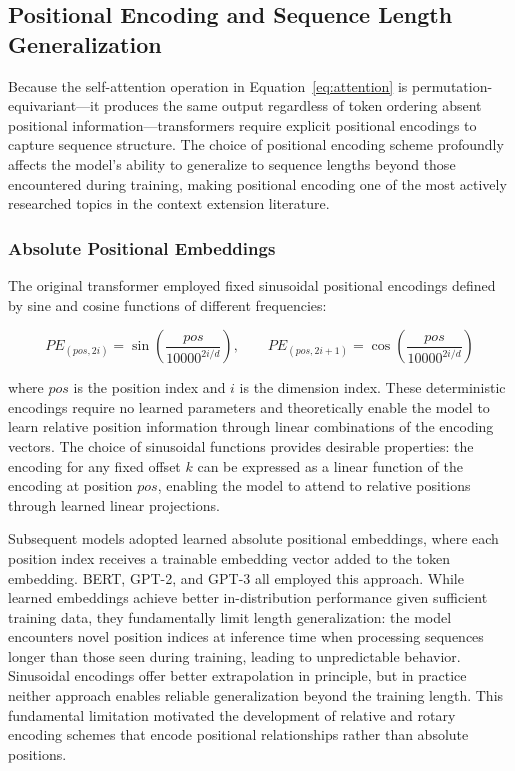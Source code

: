 \documentclass[11pt,letterpaper]{article}
\begin{document}
\subsection{Positional Encoding and Sequence Length Generalization}

Because the self-attention operation in Equation~\ref{eq:attention} is permutation-equivariant---it produces the same output regardless of token ordering absent positional information---transformers require explicit positional encodings to capture sequence structure. The choice of positional encoding scheme profoundly affects the model's ability to generalize to sequence lengths beyond those encountered during training, making positional encoding one of the most actively researched topics in the context extension literature.

\subsubsection{Absolute Positional Embeddings}

The original transformer employed fixed sinusoidal positional encodings defined by sine and cosine functions of different frequencies:

\begin{equation}
PE_{(pos, 2i)} = \sin\!\left(\frac{pos}{10000^{2i/d}}\right), \qquad PE_{(pos, 2i+1)} = \cos\!\left(\frac{pos}{10000^{2i/d}}\right)
\end{equation}

where $pos$ is the position index and $i$ is the dimension index. These deterministic encodings require no learned parameters and theoretically enable the model to learn relative position information through linear combinations of the encoding vectors. The choice of sinusoidal functions provides desirable properties: the encoding for any fixed offset $k$ can be expressed as a linear function of the encoding at position $pos$, enabling the model to attend to relative positions through learned linear projections.

Subsequent models adopted learned absolute positional embeddings, where each position index receives a trainable embedding vector added to the token embedding. BERT, GPT-2, and GPT-3 all employed this approach. While learned embeddings achieve better in-distribution performance given sufficient training data, they fundamentally limit length generalization: the model encounters novel position indices at inference time when processing sequences longer than those seen during training, leading to unpredictable behavior. Sinusoidal encodings offer better extrapolation in principle, but in practice neither approach enables reliable generalization beyond the training length. This fundamental limitation motivated the development of relative and rotary encoding schemes that encode positional relationships rather than absolute positions.
\end{document}
